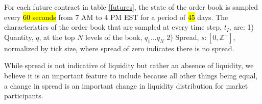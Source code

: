 For each future contract in table \ref{futures}, the state of the order book is sampled every \hl{60 seconds} from 7 AM to 4 PM EST for a period of \hl{45} days. The characteristics of the order book that are sampled at every time step, $t_I$, are:
1) Quantity, $q$, at the top $N$ levels of the book, $q_1 ... q_N$ 
2) Spread, $s: [0, \mathbb{Z}^+]$, normalized by tick size, where spread of zero indicates there is no spread.

While spread is not indicative of liquidity but rather an absence of liquidity, we believe it is an important feature to include because all other things being equal, a change in spread is an important change in liquidity distribution for market participants. 